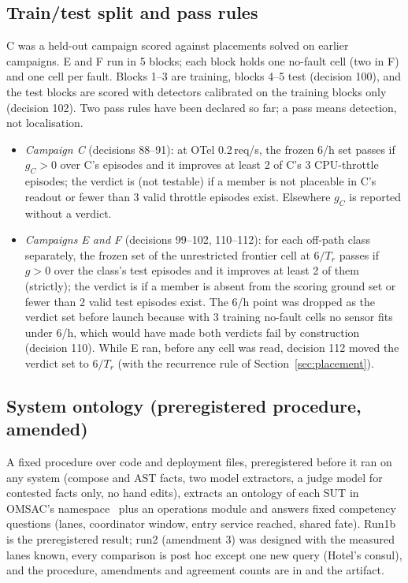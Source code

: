 \documentclass{ceurart}
\newcommand{\nv}{\textemdash}
\begin{document}
\subsection{Train/test split and pass rules}\label{sec:passrule}
C was a held-out campaign scored against placements solved on earlier campaigns. E and F run in 5 blocks; each block
holds one no-fault cell (two in F) and one cell per fault. Blocks 1--3 are training, blocks 4--5 test (decision 100), and the test blocks are scored with detectors calibrated on the training
blocks only (decision 102). Two pass rules have been declared so far; a pass means detection, not localisation.
\begin{itemize}
\item \emph{Campaign C} (decisions 88--91): at OTel 0.2\,req/s, the frozen 6/h set passes if $g_C > 0$ over C's
  episodes and it improves at least 2 of C's 3 CPU-throttle episodes; the verdict is \nv{} (not testable) if a member is not placeable in C's readout
  or fewer than 3 valid throttle episodes exist. Elsewhere $g_C$ is reported without a verdict.
\item \emph{Campaigns E and F} (decisions 99--102, 110--112): for each off-path class separately, the frozen set of the
  unrestricted frontier cell at $6/T_r$ passes if $g > 0$ over the class's test episodes and it improves at least 2 of
  them (strictly); the verdict is \nv{} if a member is absent from the scoring ground set or fewer than 2 valid test episodes exist.
  The 6/h point was dropped as the verdict set before launch because with 3 training no-fault cells no sensor fits under
  6/h, which would have made both verdicts fail by construction (decision 110). While E ran, before any cell was read,
  decision 112 moved the verdict set to $6/T_r$ (with the recurrence rule of Section~\ref{sec:placement}).
\end{itemize}

\subsection{System ontology (preregistered procedure, amended)}\label{sec:ontology}
A fixed procedure over code and deployment files, preregistered before it ran on any system (compose and AST facts, two model
extractors, a judge model for contested facts only, no hand edits), extracts an ontology of each SUT in OMSAC's
namespace~\cite{morais2021ontology} plus an operations module and answers fixed competency questions (lanes, coordinator
window, entry service reached, shared fate). Run1b is the preregistered result; run2 (amendment 3) was designed with the
measured lanes known, every comparison is post hoc except one new query (Hotel's consul), and the procedure, amendments and
agreement counts are in  and the artifact.
\end{document}
